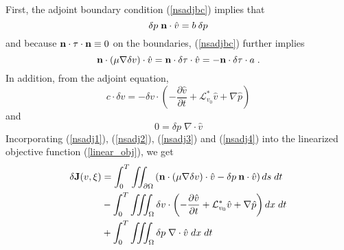 First, the adjoint boundary condition (\ref{nsadjbc}) implies that
\begin{equation} \label{nsadj1}
  \delta p\; {\bf n} \cdot {\hat v} = b\: \delta p 
\end{equation}
and because ${\bf n} \cdot \tau \cdot {\bf n} \equiv 0$ on the boundaries,
(\ref{nsadjbc}) further implies
\begin{equation} \label{nsadj2}
   {\bf n} \cdot (\mu \nabla \delta v) \cdot {\hat v}
 = {\bf n} \cdot \delta \tau \cdot {\hat v}
 = - {\bf n} \cdot \delta \tau \cdot a \;.
\end{equation}
In addition, from the adjoint equation,
\begin{equation} \label{nsadj3}
c \cdot \delta v = - \delta v \cdot
      \left( - \frac{\partial {\hat v}}{\partial t}
            + \mathcal{L}_{v_0}^* {\hat v}
            + \nabla {\hat p} \right)
\end{equation}
and
\begin{equation} \label{nsadj4}
0 = \delta p \; \nabla \cdot {\hat v}
\end{equation}
Incorporating (\ref{nsadj1}), (\ref{nsadj2}), (\ref{nsadj3}) and (\ref{nsadj4})
into the linearized objective function (\ref{linear_obj}), we get
\begin{equation} \label{linear_obj1} \begin{split}
   \delta {\bf J}(v,\xi)
   &= \int_0^T \iint_{\partial\Omega}
      \left({\bf n} \cdot (\mu \nabla \delta v) \cdot {\hat v}
    - \delta p \: {\bf n} \cdot {\hat v} \right) ds\; dt \\
   &- \int_0^T \iiint_\Omega \delta v \cdot
      \left( - \frac{\partial {\hat v}}{\partial t}
            + \mathcal{L}_{v_0}^* {\hat v}
            + \nabla {\hat p} \right) dx\;dt \\
   &+ \int_0^T \iiint_\Omega \delta p \; \nabla \cdot {\hat v}\; dx\;dt \\
\end{split} \end{equation}

